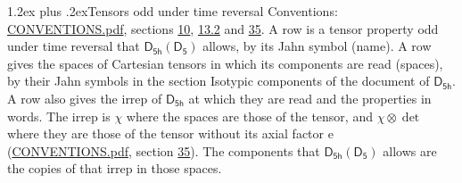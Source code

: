 \documentclass[10pt,a4paper]{article}
\makeatletter
\renewcommand\section{\@startsection{section}{1}{\z@}{-3ex plus -1ex minus -.2ex}%
  {1.2ex plus .2ex}{\normalfont\large\sffamily\bfseries\color{parttitle}}}
\numberwithin{equation}{section}
\newcommand{\grp}[1]{\mathsf{#1}}
\newcommand{\irrprod}{\otimes}
\makeatother
\begin{document}
\section{Tensors odd under time reversal}\label{s:time_odd}
Conventions: \href{../../CONVENTIONS.pdf}{CONVENTIONS.pdf}, sections \href{../../../rotation/CONVENTIONS.pdf\#conv.10}{10}, \href{../../../rotation/CONVENTIONS.pdf\#conv.13.2}{13.2} and \href{../../CONVENTIONS.pdf\#conv.35}{35}.
\leavevmode\label{n:head.name.property}A row is a tensor property odd under time reversal that $\grp{D_{5h}}(\grp{D_{5}})$ allows, by its Jahn symbol (name). \label{n:head.spaces}A row gives the spaces of Cartesian tensors in which its components are read (spaces), by their Jahn symbols in the section Isotypic components of the document of \href{../../../rotation/data/pdf/D5h.pdf}{$\grp{D_{5h}}$}. \label{n:head.properties}A row also gives the irrep of $\grp{D_{5h}}$ at which they are read and the properties in words. The irrep is $\chi$ where the spaces are those of the tensor, and $\chi \irrprod \det$ where they are those of the tensor without its axial factor e (\href{../../CONVENTIONS.pdf}{CONVENTIONS.pdf}, section \href{../../CONVENTIONS.pdf\#conv.35}{35}). The components that $\grp{D_{5h}}(\grp{D_{5}})$ allows are the copies of that irrep in those spaces.
\end{document}
